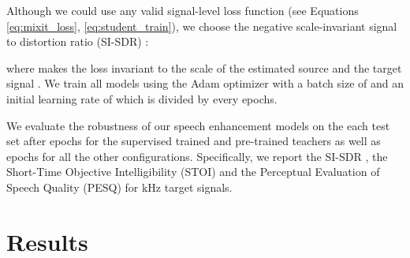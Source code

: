 \documentclass{article}
\begin{document}
Although we could use any valid signal-level loss function (see Equations \ref{eq:mixit_loss}, \ref{eq:student_train}), we choose the negative scale-invariant signal to distortion ratio (SI-SDR) \cite{sisdr}: 

where  makes the loss invariant to the scale of the estimated source  and the target signal . We train all models using the Adam optimizer \cite{adam} with a batch size of  and an initial learning rate of  which is divided by  every  epochs.

We evaluate the robustness of our speech enhancement models on the each test set after  epochs for the supervised trained and pre-trained teachers as well as  epochs for all the other configurations. Specifically, we report the SI-SDR \cite{sisdr}, the Short-Time Objective Intelligibility (STOI) \cite{stoi} and the Perceptual Evaluation of Speech Quality (PESQ) \cite{pesq} for kHz target signals.


\section{Results}
\label{sec:results}
\end{document}
